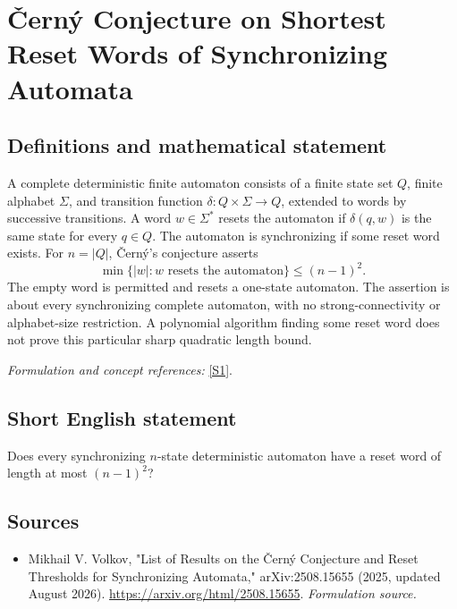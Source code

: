 \documentclass[11pt]{article}
\begin{document}
\section*{\texorpdfstring{Černý Conjecture on Shortest Reset Words of Synchronizing Automata}{Černý Conjecture on Shortest Reset Words of Synchronizing Automata}}\label{378}
\subsection{Definitions and mathematical statement}
A complete deterministic finite automaton consists of a finite state set $Q$, finite alphabet $\Sigma$, and transition function $\delta:Q\times\Sigma\to Q$, extended to words by successive transitions. A word $w\in\Sigma^*$ resets the automaton if $\delta(q,w)$ is the same state for every $q\in Q$. The automaton is synchronizing if some reset word exists. For $n=|Q|$, \v{C}ern\'y's conjecture asserts
\[
 \min\{|w|:w\text{ resets the automaton}\}\le(n-1)^2.
\]
The empty word is permitted and resets a one-state automaton. The assertion is about every synchronizing complete automaton, with no strong-connectivity or alphabet-size restriction. A polynomial algorithm finding some reset word does not prove this particular sharp quadratic length bound.
\par\smallskip\textit{Formulation and concept references:} \href{https://arxiv.org/html/2508.15655}{[S1]}.

\subsection{Short English statement}
Does every synchronizing $n$-state deterministic automaton have a reset word of length at most $(n-1)^2$?
\subsection{Sources}
\begin{itemize}
\item[S1]Mikhail V. Volkov, "List of Results on the Černý Conjecture and Reset Thresholds for Synchronizing Automata," arXiv:2508.15655 (2025, updated August 2026).
\url{https://arxiv.org/html/2508.15655}.
\textit{Formulation source.}
\end{itemize}
\end{document}
